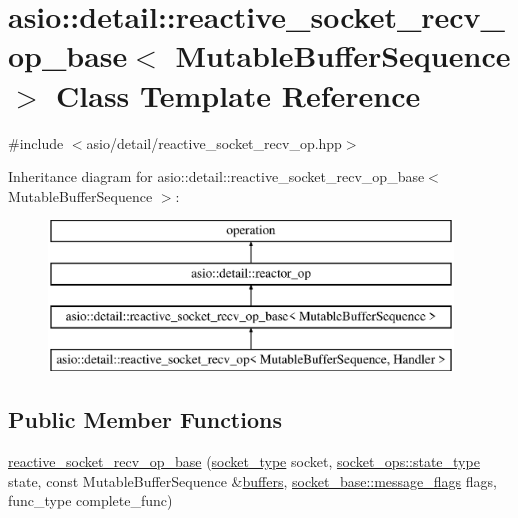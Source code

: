 \hypertarget{classasio_1_1detail_1_1reactive__socket__recv__op__base}{}\section{asio\+:\+:detail\+:\+:reactive\+\_\+socket\+\_\+recv\+\_\+op\+\_\+base$<$ Mutable\+Buffer\+Sequence $>$ Class Template Reference}
\label{classasio_1_1detail_1_1reactive__socket__recv__op__base}


{\ttfamily \#include $<$asio/detail/reactive\+\_\+socket\+\_\+recv\+\_\+op.\+hpp$>$}

Inheritance diagram for asio\+:\+:detail\+:\+:reactive\+\_\+socket\+\_\+recv\+\_\+op\+\_\+base$<$ Mutable\+Buffer\+Sequence $>$\+:\begin{figure}[H]
\begin{center}
\leavevmode
\includegraphics[height=4.000000cm]{classasio_1_1detail_1_1reactive__socket__recv__op__base}
\end{center}
\end{figure}
\subsection*{Public Member Functions}
\begin{DoxyCompactItemize}
\item 
\hyperlink{classasio_1_1detail_1_1reactive__socket__recv__op__base_a0c34653eaf19bd85a38551d2b854c72a}{reactive\+\_\+socket\+\_\+recv\+\_\+op\+\_\+base} (\hyperlink{namespaceasio_1_1detail_a6798c771dd84b79798b1a08150706ea9}{socket\+\_\+type} socket, \hyperlink{namespaceasio_1_1detail_1_1socket__ops_a5ce32ee297edef8833113ea35a933054}{socket\+\_\+ops\+::state\+\_\+type} state, const Mutable\+Buffer\+Sequence \&\hyperlink{group__async__read_ga54dede45c3175148a77fe6635222c47d}{buffers}, \hyperlink{classasio_1_1socket__base_ac3cf77465dfedfe1979b5415cf32cc94}{socket\+\_\+base\+::message\+\_\+flags} flags, func\+\_\+type complete\+\_\+func)
\end{DoxyCompactItemize}
